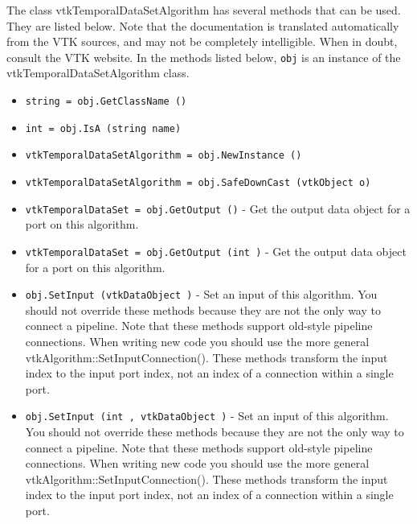 The class vtkTemporalDataSetAlgorithm has several methods that can be used.
  They are listed below.
Note that the documentation is translated automatically from the VTK sources,
and may not be completely intelligible.  When in doubt, consult the VTK website.
In the methods listed below, \verb|obj| is an instance of the vtkTemporalDataSetAlgorithm class.
\begin{itemize}
\item  \verb|string = obj.GetClassName ()|

\item  \verb|int = obj.IsA (string name)|

\item  \verb|vtkTemporalDataSetAlgorithm = obj.NewInstance ()|

\item  \verb|vtkTemporalDataSetAlgorithm = obj.SafeDownCast (vtkObject o)|

\item  \verb|vtkTemporalDataSet = obj.GetOutput ()| -  Get the output data object for a port on this algorithm.

\item  \verb|vtkTemporalDataSet = obj.GetOutput (int )| -  Get the output data object for a port on this algorithm.

\item  \verb|obj.SetInput (vtkDataObject )| -  Set an input of this algorithm. You should not override these
 methods because they are not the only way to connect a pipeline.
 Note that these methods support old-style pipeline connections.
 When writing new code you should use the more general
 vtkAlgorithm::SetInputConnection().  These methods transform the
 input index to the input port index, not an index of a connection
 within a single port.

\item  \verb|obj.SetInput (int , vtkDataObject )| -  Set an input of this algorithm. You should not override these
 methods because they are not the only way to connect a pipeline.
 Note that these methods support old-style pipeline connections.
 When writing new code you should use the more general
 vtkAlgorithm::SetInputConnection().  These methods transform the
 input index to the input port index, not an index of a connection
 within a single port.

\end{itemize}
